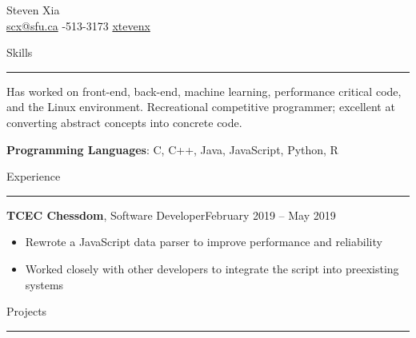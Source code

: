 \documentclass{article}
\newcommand{\entrytitle}[3]{\vspace{0.5em}\textbf{#1}, #2\hfill #3}
\renewcommand{\section}[1]{\vspace{0.5em}\Large{#1}\vspace{0.3em}\hrule\normalsize{}}
\newenvironment{entrybody}{\begin{itemize}[itemsep=0.3em]}{\end{itemize}}
\begin{document}
\pagestyle{empty}


\begin{center}
    \huge{Steven Xia} \\\vspace{0.5em}
    \normalsize{\faEnvelope\: \href{mailto:scx@sfu.ca}{scx@sfu.ca}} \qquad
    \normalsize{\faPhoneSquare*{}-513-3173} \qquad
    \normalsize{\faGithub\: \href{https://github.com/xtevenx}{xtevenx}}
\end{center} %


\section{Skills} \vspace{0.5em}

Has worked on front-end, back-end, machine learning, performance critical code, and the Linux environment.
Recreational competitive programmer; excellent at converting abstract concepts into concrete code.
\vspace{-0.2em}

\textbf{Programming Languages}: C, C++, Java, JavaScript, Python, R


\section{Experience}


\entrytitle{TCEC Chessdom}{Software Developer}{February 2019 – May 2019}
\begin{entrybody}
\item Rewrote a JavaScript data parser to improve performance and reliability
\item Worked closely with other developers to integrate the script into preexisting systems
\end{entrybody}


\section{Projects}
\end{document}
